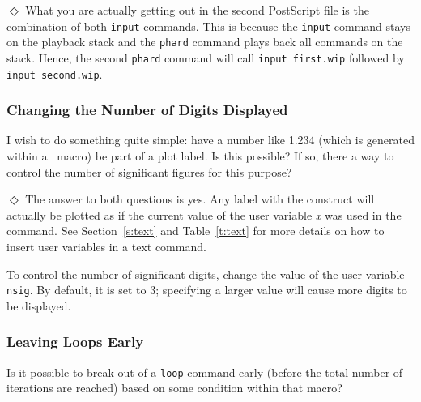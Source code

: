 \indent$\Diamond$
What you are actually getting out in the second PostScript file
is the combination of both {\tt input} commands.
This is because the {\tt input} command stays on the playback
stack and the {\tt phard} command plays back all commands
on the stack.
Hence, the second {\tt phard} command will call {\tt input first.wip}
followed by {\tt input second.wip}.

\subsubsection*         {Changing the Number of Digits Displayed}

I wish to do something quite simple: have a number like 1.234
(which is generated within a \wip\ macro) be part of a plot label.
Is this possible?
If so, there a way to control the number of significant
figures for this purpose?

\indent$\Diamond$
The answer to both questions is yes.
Any label with the construct {\tt \esc{[{\em x}]}}
will actually be plotted as if the current value of the user variable {\em x}
was used in the command.
See Section~\ref{s:text} and Table~\ref{t:text} for more details on how
to insert user variables in a text command.

To control the number of significant digits,
change the value of the user variable {\tt nsig}.
By default, it is set to 3;
specifying a larger value will cause more digits to be displayed.

\subsubsection*         {Leaving Loops Early}

Is it possible to break out of a {\tt loop} command early
(\ie before the total number of iterations are reached)
based on some condition within that macro?

